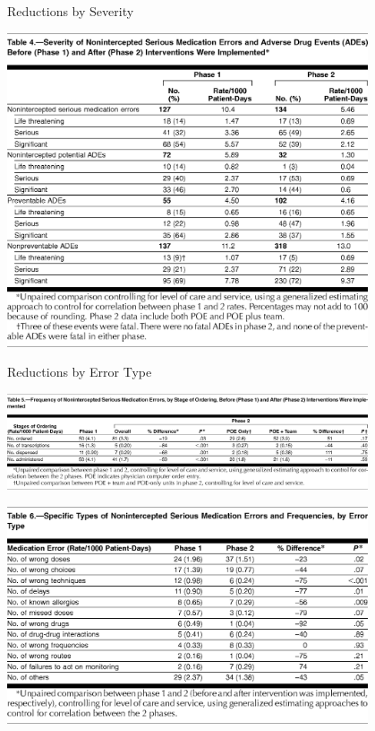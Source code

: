 \documentclass[10pt]{beamer}
\begin{document}
\begin{frame}{Reductions by Severity}
	\begin{center}
		\includegraphics[width=0.8\textwidth]{images/jama4.png}
	\end{center}	
\end{frame}

\begin{frame}{Reductions by Error Type}
	\begin{center}
		\includegraphics[width=0.8\textwidth]{images/jama5.png}
	
		\includegraphics[width=0.8\textwidth]{images/jama6.png}
	\end{center}
\end{frame}
\end{document}
